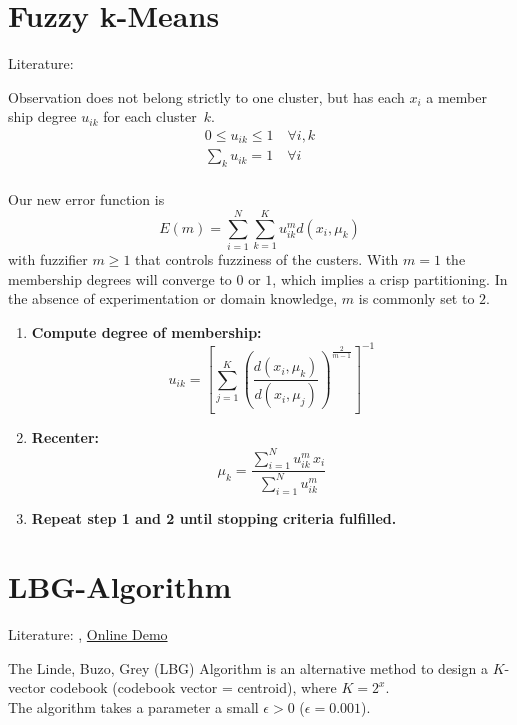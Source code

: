 \section{Fuzzy k-Means}\label{sec:fuzzy-kmeans}
Literature: \cite{Introduction2000}

Observation does not belong strictly to one cluster, but has each $x_i$ a member ship degree $u_{ik}$ for each cluster~$k$.
\begin{align}
0 \leq u_{ik} \leq 1 \quad \forall i, k\\
\sum_k u_{ik} = 1 \quad \forall i\\
\end{align}

Our new error function is
\begin{equation}\label{eq:fuzzy-kmeans-error}
E(m) = \sum_{i=1}^N \sum_{k=1}^K u_{ik}^m d(x_i, \mu_k)
\end{equation}
with fuzzifier $m \geq 1$ that controls fuzziness of the custers. With $m=1$ the membership degrees will converge to $0$ or $1$, which implies a crisp partitioning. In the absence of experimentation or domain knowledge, $m$ is commonly set to $2$.

\begin{enumerate}
\item \textbf{Compute degree of membership:}
	$$u_{ik} = \left[ \sum_{j=1}^K \left( \frac{d(x_i, \mu_k)}{d(x_i, \mu_j)} \right)^{\frac{2}{m-1}} \right]^{-1}$$
\item \textbf{Recenter:}
	$$\mu_k = \frac{\sum_{i=1}^N u_{ik}^m \, x_i}{\sum_{i=1}^N u_{ik}^m}$$
\item \textbf{Repeat step 1 and 2 until stopping criteria fulfilled.}
\end{enumerate}

\section{LBG-Algorithm}
Literature: \cite{Linde1980}, \href{http://www.data-compression.com/vqanim.shtml}{Online Demo}

The Linde, Buzo, Grey (LBG) Algorithm is an alternative method to design a $K$-vector codebook (codebook vector = centroid), where $K=2^x$.\\
The algorithm takes a parameter a small $\epsilon > 0$ (\eg $\epsilon=0.001$).

